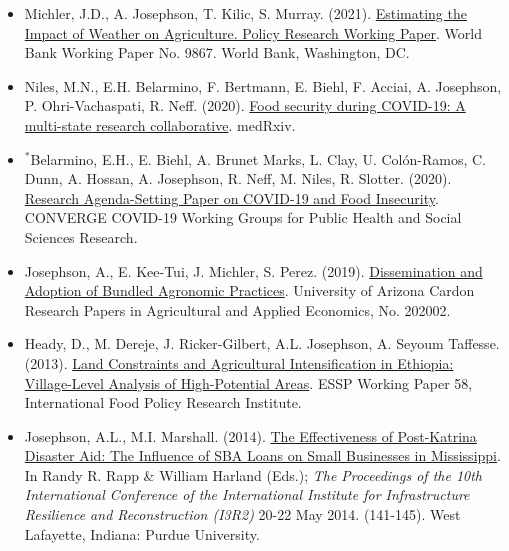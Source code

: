 \documentclass[letterpaper]{article}
\begin{document}
\begin{itemize} 
	
	\item Michler, J.D., A. Josephson, T. Kilic, S. Murray. (2021).  \href{https://openknowledge.worldbank.org/handle/10986/36643}{Estimating the Impact of Weather on Agriculture. Policy Research Working Paper}. World Bank Working Paper No. 9867. World Bank, Washington, DC. 
	
	\item Niles, M.N., E.H. Belarmino, F. Bertmann, E. Biehl, F. Acciai, A. Josephson, P. Ohri-Vachaspati, R. Neff. (2020). \href{https://www.medrxiv.org/content/10.1101/2020.12.01.20242024v1}{Food security during COVID-19: A multi-state research collaborative}. medRxiv. 
	
	\item $^*$Belarmino, E.H., E. Biehl, A. Brunet Marks, L. Clay, U. Colón-Ramos, C. Dunn, A. Hossan, A. Josephson, R. Neff, M. Niles, R. Slotter. (2020). \href{https://converge.colorado.edu/v1/uploads/images/covid_19_food_insecurity-1595251841996.pdf}{Research Agenda-Setting Paper on COVID-19 and Food Insecurity}. CONVERGE COVID-19 Working Groups for Public Health and Social Sciences Research.

	\item Josephson, A., E. Kee-Tui, J. Michler, S. Perez. (2019). \href{https://cals.arizona.edu/arec/publication/dissemination-and-adoption-bundled-agronomic-practices}{Dissemination and Adoption of Bundled Agronomic Practices}. University of Arizona Cardon Research Papers in Agricultural and Applied Economics, No. 202002.   
	
	\item Heady, D., M. Dereje, J. Ricker-Gilbert, A.L. Josephson, A. Seyoum Taffesse. (2013). 
	\href{http://ebrary.ifpri.org/cdm/ref/collection/p15738coll2/id/127846}{Land Constraints and Agricultural Intensification in Ethiopia: Village-Level Analysis of High-Potential Areas}. ESSP Working Paper 58, International Food Policy Research Institute. 	
	
	\item  Josephson, A.L., M.I. Marshall. (2014). \href{http://docs.lib.purdue.edu/i3r2/2014/rrr/2/}{The Effectiveness of Post-Katrina Disaster Aid: The Influence of SBA Loans on Small Businesses in Mississippi}. In Randy R. Rapp \& William Harland (Eds.); \textit{The Proceedings of the 10th International Conference of the International Institute for Infrastructure Resilience and Reconstruction (I3R2)} 20-22 May 2014. (141-145). West Lafayette, Indiana: Purdue University.
	
\end{itemize}
\end{document}
